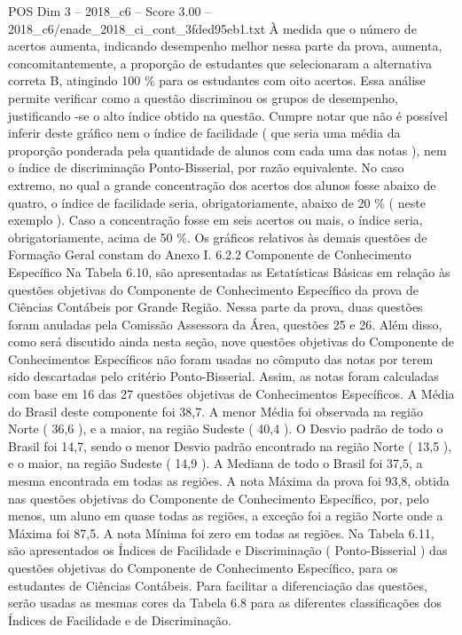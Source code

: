 \begin{textsample}{POS Dim 3 – 2018\_c6 – Score 3.00 – 2018\_c6/enade\_2018\_ci\_cont\_3fded95eb1.txt}
À medida que o número de acertos aumenta, indicando desempenho melhor nessa parte da prova, aumenta, concomitantemente, a proporção de estudantes que selecionaram a alternativa correta B, atingindo 100 \% para os estudantes com oito acertos.
Essa análise permite verificar como a questão discriminou os grupos de desempenho, justificando -se o alto índice obtido na questão.
Cumpre notar que não é possível inferir deste gráfico nem o índice de facilidade ( que seria uma média da proporção ponderada pela quantidade de alunos com cada uma das notas ), nem o índice de discriminação Ponto-Bisserial, por razão equivalente.
No caso extremo, no qual a grande concentração dos acertos dos alunos fosse abaixo de quatro, o índice de facilidade seria, obrigatoriamente, abaixo de 20 \% ( neste exemplo ).
Caso a concentração fosse em seis acertos ou mais, o índice seria, obrigatoriamente, acima de 50 \%.
Os gráficos relativos às demais questões de Formação Geral constam do Anexo I. 6.2.2 Componente de Conhecimento Específico Na Tabela 6.10, são apresentadas as Estatísticas Básicas em relação às questões objetivas do Componente de Conhecimento Específico da prova de Ciências Contábeis por Grande Região.
Nessa parte da prova, duas questões foram anuladas pela Comissão Assessora da Área, questões 25 e 26.
Além disso, como será discutido ainda nesta seção, nove questões objetivas do Componente de Conhecimentos Específicos não foram usadas no cômputo das notas por terem sido descartadas pelo critério Ponto-Bisserial.
Assim, as notas foram calculadas com base em 16 das 27 questões objetivas de Conhecimentos Específicos.
A Média do Brasil deste componente foi 38,7.
A menor Média foi observada na região Norte ( 36,6 ), e a maior, na região Sudeste ( 40,4 ).
O Desvio padrão de todo o Brasil foi 14,7, sendo o menor Desvio padrão encontrado na região Norte ( 13,5 ), e o maior, na região Sudeste ( 14,9 ).
A Mediana de todo o Brasil foi 37,5, a mesma encontrada em todas as regiões.
A nota Máxima da prova foi 93,8, obtida nas questões objetivas do Componente de Conhecimento Específico, por, pelo menos, um aluno em quase todas as regiões, a exceção foi a região Norte onde a Máxima foi 87,5.
A nota Mínima foi zero em todas as regiões.
Na Tabela 6.11, são apresentados os Índices de Facilidade e Discriminação ( Ponto-Bisserial ) das questões objetivas do Componente de Conhecimento Específico, para os estudantes de Ciências Contábeis.
Para facilitar a diferenciação das questões, serão usadas as mesmas cores da Tabela 6.8 para as diferentes classificações dos Índices de Facilidade e de Discriminação.

\end{textsample}
